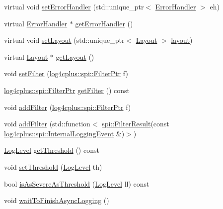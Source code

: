\begin{DoxyCompactItemize}
virtual void \hyperlink{classlog4cplus_1_1Appender_a2741f761a03a38f0ca7896b6a62ca937}{set\-Error\-Handler} (std\-::unique\-\_\-ptr$<$ \hyperlink{classlog4cplus_1_1ErrorHandler}{Error\-Handler} $>$ eh)
\item 
virtual \hyperlink{classlog4cplus_1_1ErrorHandler}{Error\-Handler} $\ast$ \hyperlink{classlog4cplus_1_1Appender_a3517c652ce7adcbb1bca6e8221adfa7f}{get\-Error\-Handler} ()
\item 
virtual void \hyperlink{classlog4cplus_1_1Appender_a560d2572a48a7b07b15efe322ebdca18}{set\-Layout} (std\-::unique\-\_\-ptr$<$ \hyperlink{classlog4cplus_1_1Layout}{Layout} $>$ \hyperlink{classlog4cplus_1_1Appender_a54860ac05a751b1c3537458edc57b84a}{layout})
\item 
virtual \hyperlink{classlog4cplus_1_1Layout}{Layout} $\ast$ \hyperlink{classlog4cplus_1_1Appender_a3f61e9ecd3d3e0adcbcc540d64f5453e}{get\-Layout} ()
\item 
void \hyperlink{classlog4cplus_1_1Appender_af1098f3d19e813d88b7d899f9720e4a5}{set\-Filter} (\hyperlink{namespacelog4cplus_1_1spi_abfdea757523ce8fe4598502a29bc7545}{log4cplus\-::spi\-::\-Filter\-Ptr} f)
\item 
\hyperlink{namespacelog4cplus_1_1spi_abfdea757523ce8fe4598502a29bc7545}{log4cplus\-::spi\-::\-Filter\-Ptr} \hyperlink{classlog4cplus_1_1Appender_ace47f808eea8b6767c2b4cafd9486216}{get\-Filter} () const 
\item 
void \hyperlink{classlog4cplus_1_1Appender_a1efff0955648d2b8e80e3d4bccb5ae0a}{add\-Filter} (\hyperlink{namespacelog4cplus_1_1spi_abfdea757523ce8fe4598502a29bc7545}{log4cplus\-::spi\-::\-Filter\-Ptr} f)
\item 
void \hyperlink{classlog4cplus_1_1Appender_ad18c81d75e0359feae9133bb6af0bfbd}{add\-Filter} (std\-::function$<$ \hyperlink{namespacelog4cplus_1_1spi_aa910f475d36c00f943ef78e37d11e3f6}{spi\-::\-Filter\-Result}(const \hyperlink{classlog4cplus_1_1spi_1_1InternalLoggingEvent}{log4cplus\-::spi\-::\-Internal\-Logging\-Event} \&)$>$)
\item 
\hyperlink{namespacelog4cplus_abd332cc8c98fefcbbdcf57b6b3867de9}{Log\-Level} \hyperlink{classlog4cplus_1_1Appender_a894b226090b2a1d2dac7a0276dbb8d7f}{get\-Threshold} () const 
\item 
void \hyperlink{classlog4cplus_1_1Appender_a058cb68bcda54ec63ff6f7e0b7febcf3}{set\-Threshold} (\hyperlink{namespacelog4cplus_abd332cc8c98fefcbbdcf57b6b3867de9}{Log\-Level} th)
\item 
bool \hyperlink{classlog4cplus_1_1Appender_a6eedcb8bd197df8becefc64d89b8ffbe}{is\-As\-Severe\-As\-Threshold} (\hyperlink{namespacelog4cplus_abd332cc8c98fefcbbdcf57b6b3867de9}{Log\-Level} ll) const 
\item 
void \hyperlink{classlog4cplus_1_1Appender_ab11a1eef1ad5934e6425c32aba28b79d}{wait\-To\-Finish\-Async\-Logging} ()
\end{DoxyCompactItemize}
